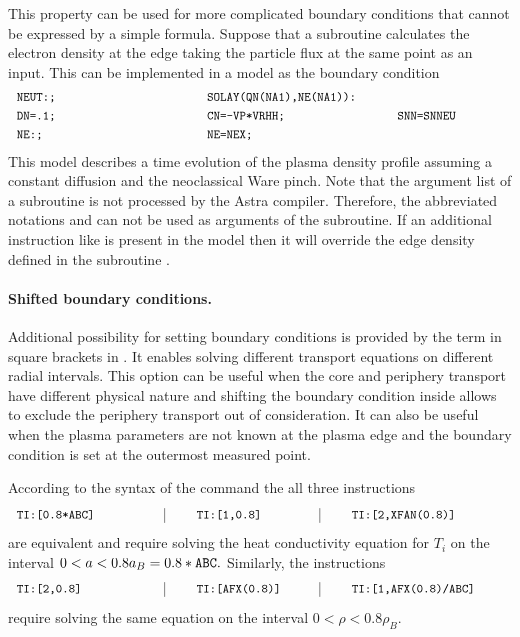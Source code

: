 This property can be used for more complicated boundary conditions
that cannot be expressed by a simple formula.
Suppose that a subroutine  calculates the electron density at
the edge  taking the particle flux at the same point
 as an input. 
This can be implemented in a model as the boundary condition
\begin{equation}\label{model2}
\begin{tabular}{p{5cm}p{5cm}p{3cm}}
{\tt NEUT:;} &\multicolumn{2}{l}{\tt SOLAY(QN(NA1),NE(NA1)):}\smallskip\\
{\tt DN=.1;} & {\tt CN=-VP*VRHH;} & {\tt SNN=SNNEU}	\smallskip\\
{\tt NE:;}   & {\tt NE=NEX;}	  & 			\smallskip\\
\end{tabular}
\end{equation}
This model describes a time evolution of the plasma density profile
assuming a constant diffusion and the neoclassical Ware pinch. 
Note that the argument list of a subroutine is not processed by the
Astra compiler. 
Therefore, the abbreviated notations  and  can not be
used as arguments of the subroutine.
If an additional instruction like  is present in the model
 then it will override the edge density defined in the
subroutine .

\paragraph{Shifted boundary conditions.} Additional possibility for
setting boundary conditions is provided by the term in square brackets
in . 
It enables solving different transport equations on different radial
intervals. 
This option can be useful when the core and periphery transport have
different physical nature and shifting the boundary condition inside
allows to exclude the periphery transport out of consideration.
It can also be useful when the plasma parameters are not known at the
plasma edge and the boundary condition is set at the outermost measured
point. 

According to the syntax of the command  the all three
instructions  
$$
\begin{tabular}{p{4cm}|p{4cm}|p{5cm}}
\tt TI:[0.8*ABC] &\qq\tt TI:[1,0.8] &\qq\tt TI:[2,XFAN(0.8)] \\
\end{tabular}
$$
are equivalent and require solving the heat conductivity equation
for $T_i$ on the interval $0<a<0.8a_B=0.8\tt*ABC.$
Similarly, the instructions
$$
\begin{tabular}{p{4cm}|p{4cm}|p{5cm}}
\tt TI:[2,0.8] &\qq\tt TI:[AFX(0.8)] &\qq\tt TI:[1,AFX(0.8)/ABC] \\
\end{tabular}
$$
require solving the same equation on the interval $0<\rho<0.8\rho_B.$

